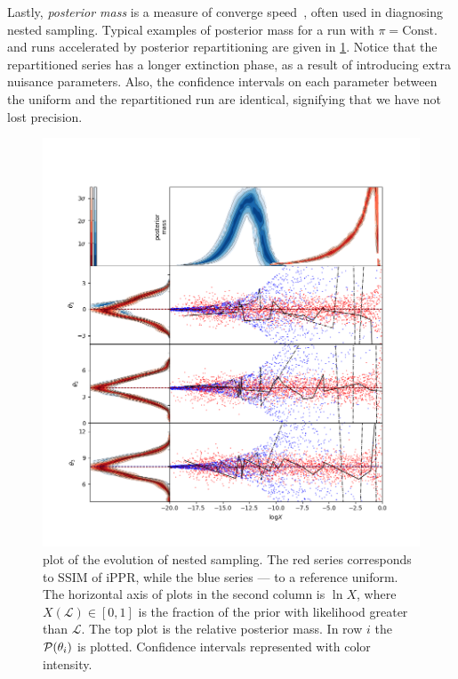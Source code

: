 \documentclass[usenatbib]{mnras}
\begin{document}
Lastly, \emph{posterior mass} is a measure of converge
speed~\cite{higson2018nestcheck}, often used in diagnosing nested
sampling. Typical examples of posterior mass for a run with
$\pi=\text{Const.}$ and runs accelerated by posterior repartitioning
are given in \cref{fig:higson}. Notice that the repartitioned series
has a longer extinction phase, as a result of introducing extra
nuisance parameters. Also, the confidence intervals on each parameter
between the uniform and the repartitioned run are identical,
signifying that we have not lost precision.

\begin{figure}
\includegraphics[width=.9\textwidth]{./illustrations/higson.png}
\caption{plot of the evolution of nested sampling. The \color{red} red
  \color{black} series corresponds to SSIM of iPPR, while the
  \color{blue} blue \color{black} series --- to a reference
  uniform. The horizontal axis of plots in the second column is
  \(\ln X\), where \(X(\mathcal{L}) \in [0,1]\) is the fraction of the
  prior with likelihood greater than \(\mathcal{L}\). The top plot is
  the relative posterior mass. In row $i$ the ${\cal P}(\theta_{i})$
  is plotted. Confidence intervals represented with color
  intensity. \label{fig:higson}}
\end{figure}
\end{document}
